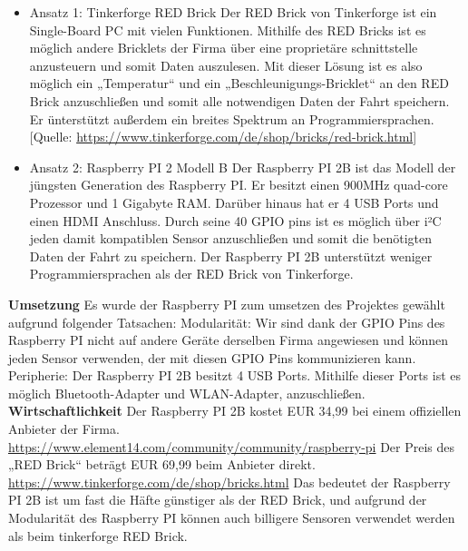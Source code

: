 \begin{itemize}
\item Ansatz 1: Tinkerforge RED Brick
Der RED Brick von Tinkerforge ist ein Single-Board PC mit vielen Funktionen.
Mithilfe des RED Bricks ist es möglich andere Bricklets der Firma über eine proprietäre schnittstelle anzusteuern und somit Daten auszulesen.
Mit dieser Lösung ist es also möglich ein „Temperatur“ und ein „Beschleunigungs-Bricklet“ an den RED Brick anzuschließen und somit alle notwendigen Daten der Fahrt speichern.
Er ünterstützt außerdem ein breites Spektrum an Programmiersprachen.
[Quelle: \url{https://www.tinkerforge.com/de/shop/bricks/red-brick.html}]

\item Ansatz 2: Raspberry PI 2 Modell B
Der Raspberry PI 2B ist das Modell der jüngsten Generation des Raspberry PI. Er besitzt einen 900MHz quad-core Prozessor und 1 Gigabyte RAM. Darüber hinaus hat er 4 USB Ports und einen HDMI Anschluss. Durch seine 40 GPIO pins ist es möglich über i²C jeden damit kompatiblen Sensor anzuschließen und somit die benötigten Daten der Fahrt zu speichern.
Der Raspberry PI 2B unterstützt weniger Programmiersprachen als der RED Brick von Tinkerforge.
\end{itemize}

\textbf{Umsetzung\newline}
\newline
Es wurde der Raspberry PI zum umsetzen des Projektes gewählt aufgrund folgender Tatsachen:
Modularität:
Wir sind dank der GPIO Pins des Raspberry PI nicht auf andere Geräte derselben Firma angewiesen und können jeden Sensor verwenden, der mit diesen GPIO Pins kommunizieren kann.
Peripherie:
Der Raspberry PI 2B besitzt 4 USB Ports. Mithilfe dieser Ports ist es möglich Bluetooth-Adapter und WLAN-Adapter, anzuschließen.
\newpage
\textbf{Wirtschaftlichkeit\newline}
\newline
Der Raspberry PI 2B kostet EUR 34,99 bei einem offiziellen Anbieter der Firma.
\url{https://www.element14.com/community/community/raspberry-pi}
Der Preis des „RED Brick“ beträgt EUR 69,99 beim Anbieter direkt.
\url{https://www.tinkerforge.com/de/shop/bricks.html}
Das bedeutet der Raspberry PI 2B ist um fast die Häfte günstiger als der RED Brick, und aufgrund der
Modularität des Raspberry PI können auch billigere Sensoren verwendet werden als beim tinkerforge
RED Brick.

